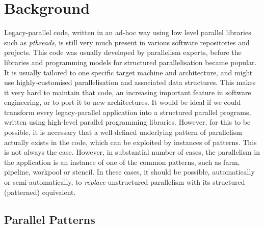 \section{Background} \label{sec:background}
Legacy-parallel code, written in an ad-hoc way using low level parallel libraries such as \emph{pthreads}, is still very much present in various software repositories and projects. This code was usually developed by parallelism experts, before the libraries and programming models for structured parallelisation became popular. It is usually tailored to one specific target machine and architecture, and might use highly-customised parallelisation and associated data structures. This makes it very hard to maintain that code, an increasing important feature in software engineering, or to port it to new architectures. It would be ideal if we could transform every legacy-parallel application into a structured parallel programs, written using high-level parallel programming libraries. However, for this to be possible, it is necessary that a well-defined underlying pattern of parallelism actually exists in the code, which can be exploited by instances of patterns. This is not always the case. However, in substantial number of cases, the parallelism in the application is an instance of one of the common patterns, such as farm, pipeline, workpool or stencil. In these cases, it should be possible, automatically or semi-automatically, to \emph{replace} unstructured parallelism with its structured (patterned) equivalent.   

\subsection{Parallel Patterns}

